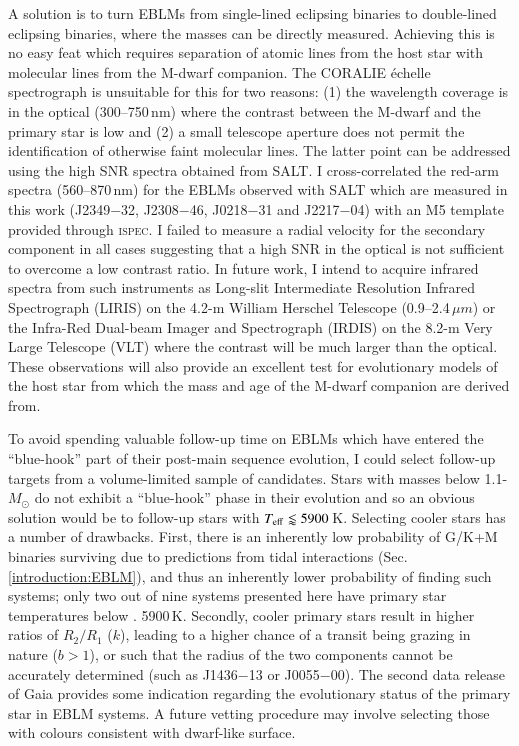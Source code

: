 A solution is to turn EBLMs from single-lined eclipsing binaries to double-lined eclipsing binaries, where the masses can be directly measured. Achieving this is no easy feat which requires separation of atomic lines from the host star with molecular lines from the M-dwarf companion. The CORALIE \'{e}chelle spectrograph is unsuitable for this for two reasons: (1) the wavelength coverage is in the optical (300--750\,nm) where the contrast between the M-dwarf and the primary star is low and (2) a small telescope aperture does not permit the identification of otherwise faint molecular lines. The latter point can be addressed using the high SNR spectra obtained from SALT. I cross-correlated the red-arm spectra (560--870\,nm) for the EBLMs observed with SALT which are measured in this work (J2349$-$32, J2308$-$46, J0218$-$31 and J2217$-$04) with an M5 template provided through \textsc{ispec}. I failed to measure a radial velocity for the secondary component in all cases suggesting that a high SNR in the optical is not sufficient to overcome a low contrast ratio. In future work, I intend to acquire infrared spectra from such instruments as Long-slit Intermediate Resolution Infrared Spectrograph (LIRIS) on the 4.2-m William Herschel Telescope (0.9--2.4$\,\mu m$) or the Infra-Red Dual-beam Imager and Spectrograph (IRDIS) on the 8.2-m Very Large Telescope (VLT) where the contrast will be much larger than the optical. These observations will also provide an excellent test for evolutionary models of the host star from which the mass and age of the M-dwarf companion are derived from.

To avoid spending valuable follow-up time on EBLMs which have entered the ``blue-hook'' part of their post-main sequence evolution, I could select follow-up targets from a volume-limited sample of candidates.  Stars with masses below 1.1-$M_\odot$ do not exhibit a ``blue-hook'' phase in their evolution and so an obvious solution would be to follow-up stars with $T_{\rm eff} \lessapprox 5900$\,K. Selecting cooler stars has a number of drawbacks. First, there is an inherently low probability of G/K+M binaries surviving due to predictions from tidal interactions (Sec. \ref{introduction:EBLM}), and thus an inherently lower probability of finding such systems; only two out of nine systems presented here have primary star temperatures below . 5900\,K. Secondly, cooler primary stars result in higher ratios of $R_2/ R_1$ ($k$), leading to a higher chance of a transit being grazing in nature ($b > 1$), or such that the radius of the two components cannot be accurately determined (such as J1436$-$13 or J0055$-$00). The second data release of Gaia provides some indication regarding the evolutionary status of the primary star in EBLM systems. A future vetting procedure may involve selecting those with colours consistent with dwarf-like surface. 

